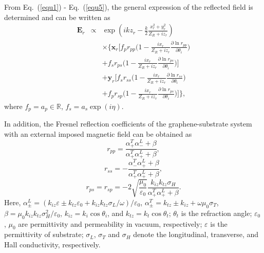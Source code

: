 \documentclass[twocolumn,showpacs,preprintnumbers,amsmath,amssymb]{revtex4}
\begin{document}
From Eq.~(\ref{equ1}) - Eq.~(\ref{equ5}), the general expression
of the reflected field is determined and can be written as
\begin{eqnarray}
\mathbf{E}_{r}&\propto&
\exp\left(ikz_{r}-\frac{k}{2}\frac{x_{r}^2+y_{r}^2}{Z_R+iz_r}\right)\nonumber\\
&&\times\bigg\{\mathbf{\hat{x}}_r\bigg[f_{p}r_{pp}\bigg(1-\frac{ix_r}{Z_{R}+iz_r}\frac{\partial\ln r_{pp}}{\partial\theta_i}\bigg)\nonumber\\
&&+f_{s}r_{ps}\bigg(1-\frac{ix_r}{Z_{R}+iz_r}\frac{\partial\ln r_{ps}}{\partial\theta_i}\bigg)\bigg]\nonumber\\
&&+\mathbf{\hat{y}}_r\bigg[f_{s}r_{ss}\bigg(1-\frac{ix_r}{Z_{R}+iz_r}\frac{\partial\ln r_{ss}}{\partial\theta_i}\bigg)\nonumber\\
&&+f_{p}r_{sp}\bigg(1-\frac{ix_r}{Z_{R}+iz_r}\frac{\partial\ln r_{ps}}{\partial\theta_i}\bigg)\bigg]\bigg\}\label{equ6},
\end{eqnarray}
where $f_{p}=a_{p}\in\mathbb{R}$, $f_{s}=a_{s}\exp(i\eta)$.

In addition, the Fresnel reflection coefficients of the graphene-substrate
system with an external imposed magnetic field can be
obtained as~\cite{Tse2011,Kamp2015,Cai2017}
\begin{equation}
 r_{pp}=\frac{\alpha^T_+\alpha_-^L+\beta}{\alpha_+^T\alpha_+^L+\beta}\label{RPP},
  \end{equation}
  \begin{equation}
 r_{ss}=-\frac{\alpha^T_-\alpha_+^L+\beta}{\alpha^T_+\alpha_+^L+\beta}\label{RSS},
  \end{equation}
  \begin{equation}
r_{ps}=r_{sp}=-2\sqrt{\frac{\mu_0}{\varepsilon_0}}\frac{k_{iz}k_{tz}\sigma_H}{\alpha^T_+\alpha_+^L+\beta}\label{RPS}.
  \end{equation}
Here, $\alpha^L_\pm=(k_{iz}\varepsilon\pm k_{tz}\varepsilon_0+k_{iz}k_{tz}\sigma_L/\omega)/\varepsilon_0$,
$\alpha^T_\pm=k_{tz}\pm k_{iz}+\omega\mu_0\sigma_T$,
$\beta=\mu_0k_{iz}k_{tz}\sigma^2_H/\varepsilon_0$,
$k_{iz}=k_i\cos\theta_i$, and $k_{tz}=k_t \cos\theta_t$;
$\theta_t$ is the refraction angle; $\varepsilon_0$ , $\mu_0$  are
permittivity and permeability in vacuum, respectively; $\varepsilon$ is the permittivity of substrate;
$\sigma_L$, $\sigma_T$ and $\sigma_H$
denote the longitudinal, transverse, and Hall conductivity, respectively.
\end{document}
